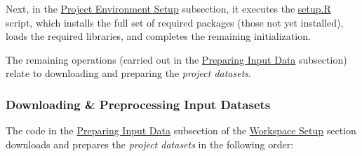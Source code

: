 \documentclass[
]{report}
\begin{document}
Next, in the \href{https://github.com/AzKurban-edX-DS/edx.capstone.choose-your-own/blob/main/r/index.R\#L10-L20}{Project Environment Setup} subsection, it executes the \hyperref[appndx_b.setup]{setup.R} script, which installs the full set of required packages (those not yet installed), loads the required libraries, and completes the remaining initialization.

The remaining operations (carried out in the \href{https://github.com/AzKurban-edX-DS/edx.capstone.choose-your-own/blob/main/r/index.R\#L21-L160}{Preparing Input Data} subsection) relate to downloading and preparing the \emph{project datasets}.

\subsubsection{Downloading \& Preprocessing Input Datasets}\label{downloading-preprocessing-input-datasets}

The code in the \href{https://github.com/AzKurban-edX-DS/edx.capstone.choose-your-own/blob/main/r/index.R\#L21-L160}{Preparing Input Data} subsection of the \href{https://github.com/AzKurban-edX-DS/edx.capstone.choose-your-own/blob/main/r/index.R\#L5-L160}{Workspace Setup} section downloads and prepares the \emph{project datasets} in the following order:
\end{document}
